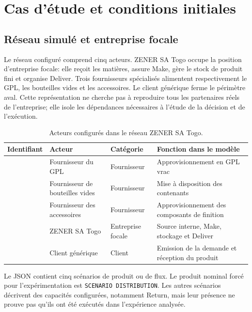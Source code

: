 \chapter{Cas d'étude et conditions initiales}
\label{chap:cas-conditions}

\section{Réseau simulé et entreprise focale}

Le réseau configuré comprend cinq acteurs. ZENER SA Togo occupe la position d'entreprise focale: elle reçoit les matières, assure Make, gère le stock de produit fini et organise Deliver. Trois fournisseurs spécialisés alimentent respectivement le GPL, les bouteilles vides et les accessoires. Le client générique ferme le périmètre aval. Cette représentation ne cherche pas à reproduire tous les partenaires réels de l'entreprise; elle isole les dépendances nécessaires à l'étude de la décision et de l'exécution.

\begin{table}[H]
  \centering
  \caption{Acteurs configurés dans le réseau ZENER SA Togo.}
  \label{tab:acteurs-zener}
  \begin{tabularx}{\textwidth}{@{}L{0.12\textwidth}L{0.32\textwidth}L{0.22\textwidth}Y@{}}
    \toprule
    Identifiant & Acteur & Catégorie & Fonction dans le modèle \\
    \midrule
     & Fournisseur du GPL & Fournisseur & Approvisionnement en GPL vrac \\
     & Fournisseur de bouteilles vides & Fournisseur & Mise à disposition des contenants \\
     & Fournisseur des accessoires & Fournisseur & Approvisionnement des composants de finition \\
     & ZENER SA Togo & Entreprise focale & Source interne, Make, stockage et Deliver \\
     & Client générique & Client & Emission de la demande et réception du produit \\
    \bottomrule
  \end{tabularx}
\end{table}

Le JSON contient cinq scénarios de produit ou de flux. Le produit nominal forcé pour l'expérimentation est \texttt{SCENARIO DISTRIBUTION}. Les autres scénarios décrivent des capacités configurées, notamment Return, mais leur présence ne prouve pas qu'ils ont été exécutés dans l'expérience analysée.

